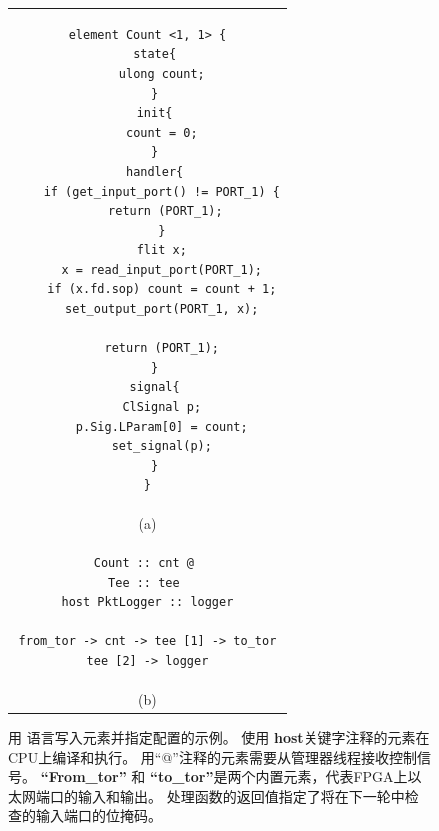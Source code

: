 \begin{figure}[htbp]
\small \lstset{style=numbers}

\centering
\begin{tabular}{c}
\small
\begin{lstlisting}
element Count <1, 1> {
  state{
    ulong count;
  }
  init{
    count = 0;
  }
  handler{
    if (get_input_port() != PORT_1) {
      return (PORT_1); 
    }
    flit x;
    x = read_input_port(PORT_1);
    if (x.fd.sop) count = count + 1;
    set_output_port(PORT_1, x);
   
    return (PORT_1);
  }
  signal{
    ClSignal p;
    p.Sig.LParam[0] = count;
    set_signal(p);
  }
}
\end{lstlisting} \vspace{3pt} \\
{\normalsize \centering (a)} \vspace{3pt} \\
\begin{lstlisting}
Count :: cnt @ 
Tee :: tee 
host PktLogger :: logger

from_tor -> cnt -> tee [1] -> to_tor
tee [2] -> logger
\end{lstlisting} \vspace{3pt} \\
{\normalsize \centering (b)} 
\end{tabular}
\caption{用 \name 语言写入元素并指定配置的示例。 使用 \textbf {host}关键字注释的元素在CPU上编译和执行。 用“@”注释的元素需要从管理器线程接收控制信号。
	\textbf {``From\_tor''} 和 \textbf {``to\_tor''}是两个内置元素，代表FPGA上以太网端口的输入和输出。 处理函数的返回值指定了将在下一轮中检查的输入端口的位掩码。}
\label{clicknp:fig:lang}

\end{figure}

